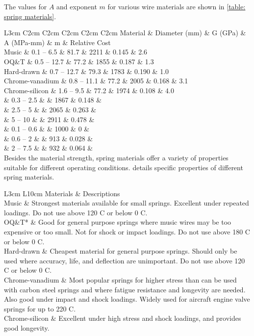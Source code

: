 \documentclass[a4paper,openany,12pt]{book}
\begin{document}
{{The values for \(A\) and exponent \(m\) for various wire materials are shown
in \ref{table: spring materials}.


 L3cm C2cm C2cm C2cm C2cm C2cm Material \& Diameter (mm) \& G (GPa) \& A
(MPa-mm) \& m \& Relative Cost\\
Music \& 0.1 -- 6.5 \& 81.7 \& 2211 \& 0.145 \& 2.6\\
OQ\&T \& 0.5 -- 12.7 \& 77.2 \& 1855 \& 0.187 \& 1.3\\
Hard-drawn \& 0.7 -- 12.7 \& 79.3 \& 1783 \& 0.190 \& 1.0\\
Chrome-vanadium \& 0.8 -- 11.1 \& 77.2 \& 2005 \& 0.168 \& 3.1\\
Chrome-silicon \& 1.6 -- 9.5 \& 77.2 \& 1974 \& 0.108 \& 4.0\\
\& 0.3 -- 2.5 \& \& 1867 \& 0.148 \&\\
\& 2.5 -- 5 \& \& 2065 \& 0.263 \&\\
\& 5 -- 10 \& \& 2911 \& 0.478 \&\\
\& 0.1 -- 0.6 \& \& 1000 \& 0 \&\\
\& 0.6 -- 2 \& \& 913 \& 0.028 \&\\
\& 2 -- 7.5 \& \& 932 \& 0.064 \&\\

Besides the material strength, spring materials offer a variety of
properties suitable for different operating conditions. details specific
properties of different spring materials.


 L3cm L10cm Materials \& Descriptions\\
Music \& Strongest materials available for small springs. Excellent under
repeated loadings. Do not use above 120 C or below 0 C.\\
OQ\&T* \& Good for general purpose springs where music wires may be too
expensive or too small. Not for shock or impact loadings. Do not use
above 180 C or below 0 C.\\
Hard-drawn \& Cheapest material for general purpose springs. Should only
be used where accuracy, life, and deflection are unimportant. Do not use
above 120 C or below 0 C.\\
Chrome-vanadium \& Most popular springs for higher stress than can be
used with carbon steel springs and where fatigue resistance and
longevity are needed. Also good under impact and shock loadings. Widely
used for aircraft engine valve springs for up to 220 C.\\
Chrome-silicon \& Excellent under high stress and shock loadings, and
provides good longevity.\\

}}
\end{document}
